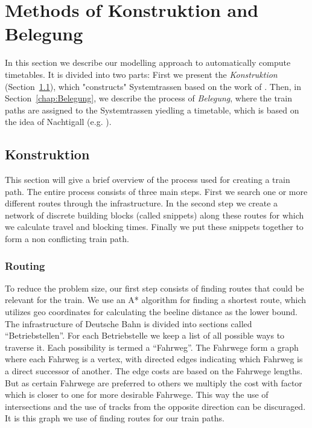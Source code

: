 \section{Methods of Konstruktion and Belegung}
\label{chap:methods}
In this section we describe our modelling approach to automatically compute timetables. It is divided into two parts: First we present the \emph{Konstruktion} (Section~\ref{chap:Konstruktion}), which "constructs" Systemtrassen based on the work of \cite{O:2009}. Then, in Section~\ref{chap:Belegung}, we describe the process of \emph{Belegung}, where the train paths are assigned to the Systemtrassen yiedling a timetable, which is based on the idea of Nachtigall (e.g. \cite{NO:2014, N:1998, N:2015}).

\subsection{Konstruktion}
\label{chap:Konstruktion}

This section will give a brief overview of the process used for creating a train path. The entire process consists of three main steps. First we search one or more different routes through the infrastructure. In the second step we create a network of discrete building blocks (called snippets) along these routes for which we calculate travel and blocking times. Finally we put these snippets together to form a non conflicting train path.


\subsubsection{Routing}

To reduce the problem size, our first step consists of finding routes that could be relevant for the train. We use an A* algorithm for finding a shortest route, which utilizes geo coordinates for calculating the beeline distance as the lower bound. The infrastructure of Deutsche Bahn is divided into sections called ``Betriebstellen''. For each Betriebstelle we keep a list of all possible ways to traverse it. Each possibility is termed a ``Fahrweg''. The Fahrwege form a graph where each Fahrweg is a vertex, with directed edges indicating which Fahrweg is a direct successor of another. The edge costs are based on the Fahrwege lengths. But as certain Fahrwege are preferred to others we multiply the cost with factor which is closer to one for more desirable Fahrwege. This way the use of intersections and the use of tracks from the opposite direction can be discuraged. It is this graph we use of finding routes for our train paths.

